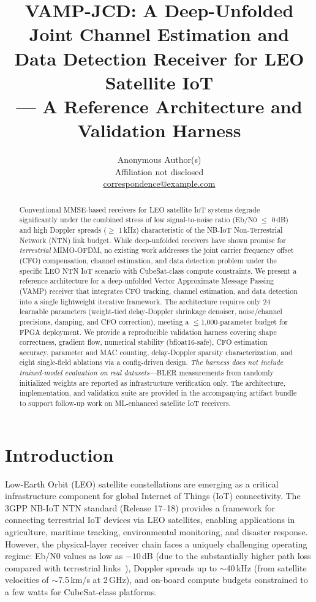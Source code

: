 \documentclass{article}
\title{VAMP-JCD: A Deep-Unfolded Joint Channel Estimation and\\Data Detection Receiver for LEO Satellite IoT\\
--- A Reference Architecture and Validation Harness}
\author{Anonymous Author(s)\\
Affiliation not disclosed\\
\href{mailto:correspondence@example.com}{correspondence@example.com}}
\begin{document}
\maketitle

\begin{abstract}
Conventional MMSE-based receivers for LEO satellite IoT systems degrade significantly under the combined stress of low signal-to-noise ratio (Eb/N0 $\leq$ 0\,dB) and high Doppler spreads ($\geq$ 1\,kHz) characteristic of the NB-IoT Non-Terrestrial Network (NTN) link budget. While deep-unfolded receivers have shown promise for \emph{terrestrial} MIMO-OFDM, no existing work addresses the joint carrier frequency offset (CFO) compensation, channel estimation, and data detection problem under the specific LEO NTN IoT scenario with CubeSat-class compute constraints. We present a reference architecture for a deep-unfolded Vector Approximate Message Passing (VAMP) receiver that integrates CFO tracking, channel estimation, and data detection into a single lightweight iterative framework. The architecture requires only 24 learnable parameters (weight-tied delay-Doppler shrinkage denoiser, noise/channel precisions, damping, and CFO correction), meeting a $\leq$1,000-parameter budget for FPGA deployment. We provide a reproducible validation harness covering shape correctness, gradient flow, numerical stability (bfloat16-safe), CFO estimation accuracy, parameter and MAC counting, delay-Doppler sparsity characterization, and eight single-field ablations via a config-driven design. \emph{The harness does not include trained-model evaluation on real datasets}---BLER measurements from randomly initialized weights are reported as infrastructure verification only. The architecture, implementation, and validation suite are provided in the accompanying artifact bundle to support follow-up work on ML-enhanced satellite IoT receivers.
\end{abstract}

\section{Introduction}

Low-Earth Orbit (LEO) satellite constellations are emerging as a critical infrastructure component for global Internet of Things (IoT) connectivity. The 3GPP NB-IoT NTN standard (Release 17--18) provides a framework for connecting terrestrial IoT devices via LEO satellites, enabling applications in agriculture, maritime tracking, environmental monitoring, and disaster response. However, the physical-layer receiver chain faces a uniquely challenging operating regime: Eb/N0 values as low as $-10$\,dB (due to the substantially higher path loss compared with terrestrial links~\cite{3gppTR38811}), Doppler spreads up to $\sim$40\,kHz (from satellite velocities of $\sim$7.5\,km/s at 2\,GHz), and on-board compute budgets constrained to a few watts for CubeSat-class platforms.
\end{document}

